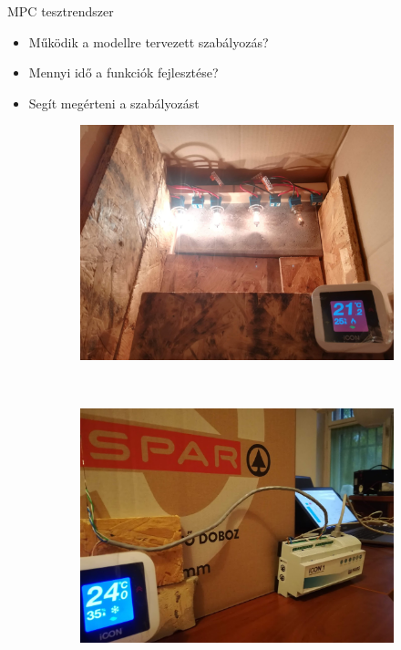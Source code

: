 \documentclass[14pt,handout]{beamer}
\begin{document}
\begin{frame}{MPC tesztrendszer}


\begin{itemize}
	\item Működik a modellre tervezett szabályozás?
	\item Mennyi idő a funkciók fejlesztése?
	\item Segít megérteni a szabályozást
\end{itemize}


\begin{figure}
	\begin{subfigure}[t]{0.45\textwidth}
			\centering
			\includegraphics[width=\textwidth]{picture/inside2.jpg}	
		\end{subfigure}
		~
		\begin{subfigure}[t]{0.45\textwidth}
			\centering
			\includegraphics[width=\textwidth]{picture/outside.jpg}	
		\end{subfigure}
\end{figure}

\end{frame}
\end{document}
